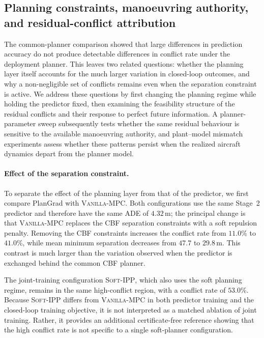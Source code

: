 \documentclass[11pt]{article}
\theoremstyle{plain}
\theoremstyle{definition}
\newcommand{\method}{PlanGrad}
\begin{document}
\subsection{Planning constraints, manoeuvring authority, and residual-conflict attribution}
\label{sec:results-mechanism}

The common-planner comparison showed that large differences in
prediction accuracy do not produce detectable differences in conflict
rate under the deployment planner. This leaves two related questions:
whether the planning layer itself accounts for the much larger
variation in closed-loop outcomes, and why a non-negligible set of
conflicts remains even when the separation constraint is active. We
address these questions by first changing the planning regime while
holding the predictor fixed, then examining the feasibility structure
of the residual conflicts and their response to perfect future
information. A planner-parameter sweep subsequently tests whether the
same residual behaviour is sensitive to the available manoeuvring
authority, and plant--model mismatch experiments assess whether these
patterns persist when the realized aircraft dynamics depart from the
planner model.

\paragraph{Effect of the separation constraint.}

To separate the effect of the planning layer from that of the
predictor, we first compare \method{} with \textsc{Vanilla-MPC}.
Both configurations use the same Stage~2 predictor and therefore have
the same ADE of $4.32$\,m; the principal change is that
\textsc{Vanilla-MPC} replaces the CBF separation constraints with a
soft repulsion penalty. Removing the CBF constraints increases the
conflict rate from $11.0\%$ to $41.0\%$, while mean minimum
separation decreases from $47.7$ to $29.8$\,m. This contrast is much
larger than the variation observed when the predictor is exchanged
behind the common CBF planner.

The joint-training configuration \textsc{Soft-IPP}, which also uses
the soft planning regime, remains in the same high-conflict region,
with a conflict rate of $53.0\%$. Because \textsc{Soft-IPP} differs
from \textsc{Vanilla-MPC} in both predictor training and the
closed-loop training objective, it is not interpreted as a matched
ablation of joint training. Rather, it provides an additional
certificate-free reference showing that the high conflict rate is not
specific to a single soft-planner configuration.
\end{document}
